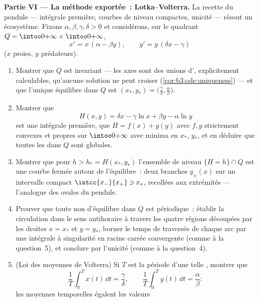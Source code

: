 \begin{problem}
\medskip
\noindent\textbf{Partie VI --- La méthode exportée~:
Lotka--Volterra.} La recette du pendule --- intégrale
première, courbes de niveau compactes, unicité --- résout un
écosystème. Fixons $\alpha, \beta, \gamma, \delta > 0$ et
considérons, sur le quadrant  $Q =
\intoo0{+\infty}\times\intoo0{+\infty}$,
\[
x' = x\,(\alpha - \beta y), \qquad
y' = y\,(\delta x - \gamma)
\]
($x$ proies, $y$ prédateurs).
\begin{enumerate}[resume]
  \item Montrer que $Q$ est invariant --- les axes sont des
        unions d', explicitement calculables, qu'aucune
        solution ne peut croiser
        (\cref{cor:b3:ode:uniqueness}) --- et que l'unique
        équilibre dans $Q$ est $(x_*, y_*) =
        \bigl(\frac\gamma\delta, \frac\alpha\beta\bigr)$.
  \item Montrer que
        \[
        H(x, y) = \delta x - \gamma\ln x + \beta y -
        \alpha\ln y
        \]
        est une intégrale première, que $H = f(x) + g(y)$
        avec $f, g$ strictement convexes et propres sur
        $\intoo0{+\infty}$ avec minima en $x_*$, $y_*$, et
        en déduire que toutes les  dans
        $Q$ sont globales.
  \item Montrer que pour $h > h_* = H(x_*, y_*)$ l'ensemble
        de niveau $\{H = h\}\cap Q$ est une courbe fermée
        autour de l'équilibre~: deux branches 
        $y_\pm(x)$ sur un intervalle compact
        $\intcc{x_-}{x_+} \ni x_*$, recollées aux
        extrémités --- l'analogue des ovales du pendule.
  \item Prouver que toute  non d'équilibre dans $Q$
        est périodique~: établir la circulation dans le sens
        antihoraire à travers les quatre régions découpées
        par les droites $x = x_*$ et $y = y_*$, borner le
        temps de traversée de chaque arc par une intégrale à
        singularité en racine carrée convergente (comme à la
        question~5), et conclure par l'unicité (comme à la
        question~4).
  \item (Loi des moyennes de Volterra) Si $T$ est la période
        d'une telle , montrer que
        \[
        \frac1T\int_0^Tx(t)\,\dd t = \frac\gamma\delta,
        \qquad
        \frac1T\int_0^Ty(t)\,\dd t = \frac\alpha\beta :
        \]
        les moyennes temporelles égalent les valeurs

\end{enumerate}
\end{problem}
